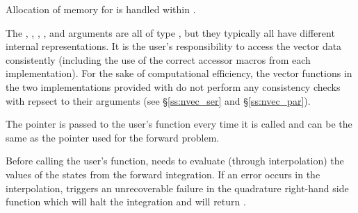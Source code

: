 {
  Allocation of memory for  is handled within {\idas}.

  The , , , , and  arguments are all
  of type , but they typically all have
  different internal representations. It is the user's
  responsibility to access the vector data consistently (including the use of the
  correct accessor macros from each {\nvector} implementation). For the sake of
  computational efficiency, the vector functions in the two {\nvector} implementations
  provided with {\idas} do not perform any consistency checks with repsect to their
   arguments (see \S\ref{ss:nvec_ser} and \S\ref{ss:nvec_par}).

  The  pointer is passed to the user's  function every time
  it is called and can be the same as the  pointer used for the forward problem.

  {\warn}Before calling the user's  function, {\idas} needs to evaluate
  (through interpolation) the values of the states from the forward integration.
  If an error occurs in the interpolation, {\idas} triggers an unrecoverable
  failure in the quadrature right-hand side function which will halt the integration and
   will return .
}

